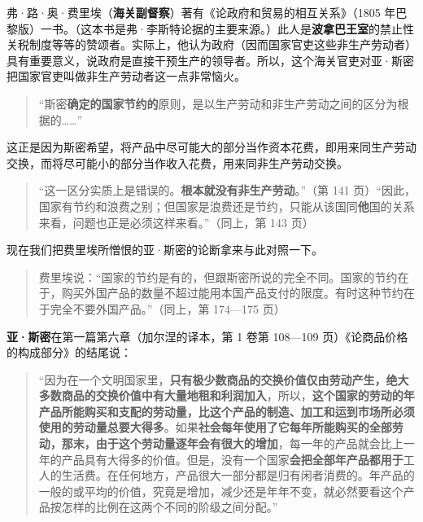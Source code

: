 
弗·路·奥·费里埃（\textbf{海关副督察}）著有《论政府和贸易的相互关系》（1805 年巴黎版）一书。（这本书是弗·李斯特论据的主要来源。）此人是\textbf{波拿巴王室}的禁止性关税制度等等的赞颂者。实际上，他认为政府（因而国家官吏这些非生产劳动者）具有重要意义，说政府是直接干预生产的领导者。所以，这个海关官吏对亚·斯密把国家官吏叫做非生产劳动者这一点非常恼火。

\begin{quote}“斯密\textbf{确定的国家节约的}原则，是以生产劳动和非生产劳动之间的区分为根据的……”\end{quote}

\fontbox{~\{}这正是因为斯密希望，将产品中尽可能大的部分当作资本花费，即用来同生产劳动交换，而将尽可能小的部分当作收入花费，用来同非生产劳动交换。\fontbox{\}~}

\begin{quote}“这一区分实质上是错误的。\textbf{根本就没有非生产劳动}。”（第 141 页）“因此，国家有节约和浪费之别；但国家是浪费还是节约，只能从该国同\textbf{他}国的关系来看，问题也正是必须这样来看。”（同上，第 143 页）\end{quote}

现在我们把费里埃所憎恨的亚·斯密的论断拿来与此对照一下。

\begin{quote}费里埃说：“国家的节约是有的，但跟斯密所说的完全不同。国家的节约在于，购买外国产品的数量不超过能用本国产品支付的限度。有时这种节约在于完全不要外国产品。”（同上，第 174—175 页）\end{quote}

\fontbox{~\{}\textbf{亚·斯密}在第一篇第六章（加尔涅的译本，第 1 卷第 108—109 页）《论商品价格的构成部分》的结尾说：

\begin{quote}“因为在一个文明国家里，\textbf{只有极少数商品的交换价值仅由劳动产生，绝大多数商品的交换价值中有大量地租和利润加入}，所以，\textbf{这个国家的劳动的年产品所能购买和支配的劳动量，比这个产品的制造、加工和运到市场所必须使用的劳动量总要大得多}。如果\textbf{社会每年使用了它每年所能购买的全部劳动，那末，由于这个劳动量逐年会有很大的增加}，每一年的产品就会比上一年的产品具有大得多的价值。但是，没有一个国家\textbf{会把全部年产品都用于}工人的生活费。在任何地方，产品很大一部分都是归有闲者消费的。年产品的一般的或平均的价值，究竟是增加，减少还是年年不变，就必然要看这个产品按怎样的比例在这两个不同的阶级之间分配。”\end{quote}

